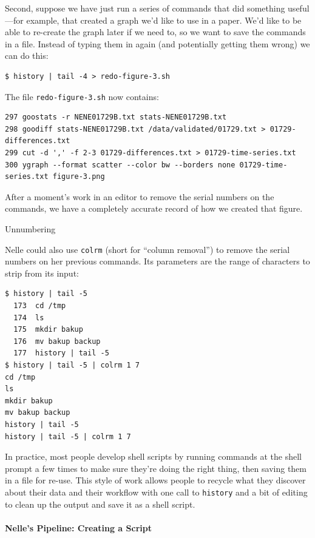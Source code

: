\documentclass{book}
\begin{document}
Second, suppose we have just run a series of commands that did something
useful---for example, that created a graph we'd like to use in a paper.
We'd like to be able to re-create the graph later if we need to, so we
want to save the commands in a file. Instead of typing them in again
(and potentially getting them wrong) we can do this:

\begin{verbatim}
$ history | tail -4 > redo-figure-3.sh
\end{verbatim}

The file \texttt{redo-figure-3.sh} now contains:

\begin{verbatim}
297 goostats -r NENE01729B.txt stats-NENE01729B.txt
298 goodiff stats-NENE01729B.txt /data/validated/01729.txt > 01729-differences.txt
299 cut -d ',' -f 2-3 01729-differences.txt > 01729-time-series.txt
300 ygraph --format scatter --color bw --borders none 01729-time-series.txt figure-3.png
\end{verbatim}

After a moment's work in an editor to remove the serial numbers on the
commands, we have a completely accurate record of how we created that
figure.

\begin{swcbox}{Unnumbering}

Nelle could also use \texttt{colrm} (short for ``column removal'') to
remove the serial numbers on her previous commands. Its parameters are
the range of characters to strip from its input:

\begin{verbatim}
$ history | tail -5
  173  cd /tmp
  174  ls
  175  mkdir bakup
  176  mv bakup backup
  177  history | tail -5
$ history | tail -5 | colrm 1 7
cd /tmp
ls
mkdir bakup
mv bakup backup
history | tail -5
history | tail -5 | colrm 1 7
\end{verbatim}

\end{swcbox}

In practice, most people develop shell scripts by running commands at
the shell prompt a few times to make sure they're doing the right thing,
then saving them in a file for re-use. This style of work allows people
to recycle what they discover about their data and their workflow with
one call to \texttt{history} and a bit of editing to clean up the output
and save it as a shell script.

\mbox{}\paragraph{Nelle's Pipeline: Creating a Script}
\end{document}
